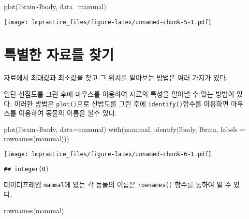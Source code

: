 \documentclass[
]{book}
\newenvironment{Shaded}{\begin{snugshade}}{\end{snugshade}}
\newcommand{\AttributeTok}[1]{\textcolor[rgb]{0.77,0.63,0.00}{#1}}
\newcommand{\FunctionTok}[1]{\textcolor[rgb]{0.00,0.00,0.00}{#1}}
\newcommand{\NormalTok}[1]{#1}
\newcommand{\SpecialCharTok}[1]{\textcolor[rgb]{0.00,0.00,0.00}{#1}}
\begin{document}
\begin{Shaded}
\begin{Highlighting}[]
\FunctionTok{plot}\NormalTok{(lbrain}\SpecialCharTok{\textasciitilde{}}\NormalTok{lbody, }\AttributeTok{data=}\NormalTok{mammal)}
\end{Highlighting}
\end{Shaded}

\texttt{[image: lmpractice\_files/figure-latex/unnamed-chunk-5-1.pdf]}

\hypertarget{uxd2b9uxbcc4uxd55c-uxc790uxb8ccuxb97c-uxcc3euxae30}{%
\section{특별한 자료를 찾기}\label{uxd2b9uxbcc4uxd55c-uxc790uxb8ccuxb97c-uxcc3euxae30}}

자료에서 최대값과 최소값을 찾고 그 위치를 알아보는 방법은 여러 가지가 있다.

일단 산점도를 그린 후에 마우스를 이용하여 자료의 특성을 알아낼 수 있는 방법이 있다.
이러한 방법은 \texttt{plot()}으로 산범도를 그린 후에 \texttt{identify()}함수를 이용하면 마우스를 이용하여 동물의 이름을 볼수 있다.

\begin{Shaded}
\begin{Highlighting}[]
\FunctionTok{plot}\NormalTok{(lbrain}\SpecialCharTok{\textasciitilde{}}\NormalTok{lbody, }\AttributeTok{data=}\NormalTok{mammal)}
\FunctionTok{with}\NormalTok{(mammal, }\FunctionTok{identify}\NormalTok{(lbody, lbrain, }\AttributeTok{labels =} \FunctionTok{rownames}\NormalTok{(mammal)))}
\end{Highlighting}
\end{Shaded}

\texttt{[image: lmpractice\_files/figure-latex/unnamed-chunk-6-1.pdf]}

\begin{verbatim}
## integer(0)
\end{verbatim}

데이터프레임 \texttt{mammal}에 있는 각 동물의 이름은 \texttt{rownames()} 함수를 통하여 알 수 있다.

\begin{Shaded}
\begin{Highlighting}[]
\FunctionTok{rownames}\NormalTok{(mammal)}
\end{Highlighting}
\end{Shaded}
\end{document}
